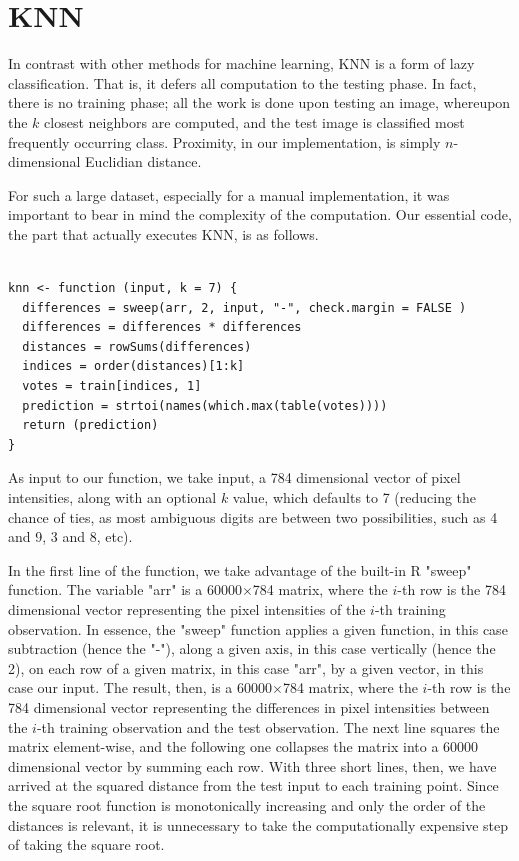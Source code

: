 \documentclass[10pt]{extarticle}
\begin{document}
\section{KNN}
In contrast with other methods for machine learning, KNN is a form of lazy classification. That is, it defers all computation to the testing phase. In fact, there is no training phase; all the work is done upon testing an image, whereupon the $k$ closest neighbors are computed, and the test image is classified most frequently occurring class. Proximity, in our implementation, is simply $n$-dimensional Euclidian distance.

For such a large dataset, especially for a manual implementation, it was important to bear in mind the complexity of the computation. Our essential code, the part that actually executes KNN, is as follows. 

\begin{verbatim}

knn <- function (input, k = 7) {
  differences = sweep(arr, 2, input, "-", check.margin = FALSE )
  differences = differences * differences
  distances = rowSums(differences)
  indices = order(distances)[1:k]
  votes = train[indices, 1]
  prediction = strtoi(names(which.max(table(votes))))
  return (prediction)
}
\end{verbatim}


As input to our function, we take input, a 784 dimensional vector of pixel intensities, along with an optional $k$ value, which defaults to 7 (reducing the chance of ties, as most ambiguous digits are between two possibilities, such as 4 and 9, 3 and 8, etc). 

In the first line of the function, we take advantage of the built-in R "sweep" function. The variable "arr" is a 60000$\times$784 matrix, where the $i$-th row is the 784 dimensional vector representing the pixel intensities of the $i$-th training observation. In essence, the "sweep" function applies a given function, in this case subtraction (hence the "-"), along a given axis, in this case vertically (hence the 2), on each row of a given matrix, in this case "arr", by a given vector, in this case our input. The result, then, is a 60000$\times$784 matrix, where the $i$-th row is the 784 dimensional vector representing the differences in pixel intensities between the $i$-th training observation and the test observation. The next line squares the matrix element-wise, and the following one collapses the matrix into a 60000 dimensional vector by summing each row. With three short lines, then, we have arrived at the squared distance from the test input to each training point. Since the square root function is monotonically increasing and only the order of the distances is relevant, it is unnecessary to take the computationally expensive step of taking the square root. 
\end{document}
